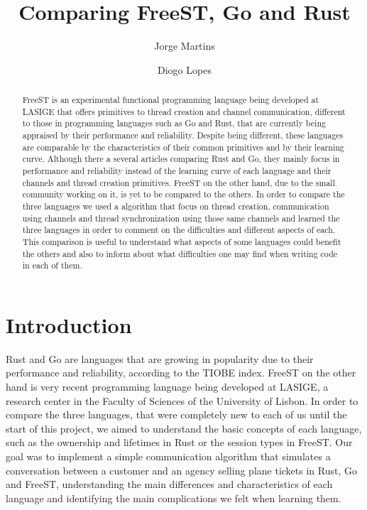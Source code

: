 \documentclass[runningheads]{llncs}
\begin{document}
\title{Comparing FreeST, Go and Rust}
\author{Jorge Martins \and
Diogo Lopes
}
\nocite{*}
\maketitle
\thispagestyle{empty}
\begin{abstract}
FreeST is an experimental functional programming language being developed at LASIGE that offers primitives to thread creation and channel communication, different to those in programming languages such as Go and Rust, that are currently being appraised by their performance and reliability. Despite being different, these languages are comparable by the characteristics of their common primitives and by their learning curve. Although there a several articles comparing Rust and Go, they mainly focus in performance and reliability instead of the learning curve of each language and their channels and thread creation primitives. FreeST on the other hand, due to the small community working on it, is yet to be compared to the others.
In order to compare the three languages we used a algorithm that focus on thread creation, communication using channels and thread synchronization using those same channels and learned the three languages in order to comment on the difficulties and different aspects of each.
This comparison is useful to understand what aspects of some languages could benefit the others and also to inform about what difficulties one may find when writing code in each of them.
\end{abstract}
\section{Introduction}
Rust and Go are languages that are growing in popularity due to their performance and reliability, according to the TIOBE index. FreeST\cite{freest} on the other hand is very recent programming language being developed at LASIGE, a research center in the Faculty of Sciences of the University of Lisbon.
In order to compare the three languages, that were completely new to each of us until the start of this project, we aimed to understand the basic concepts of each language, such as the ownership and lifetimes in Rust or the session types \cite{session} in FreeST.
Our goal was to implement a simple communication algorithm that simulates a conversation between a customer and an agency selling plane tickets in Rust, Go and FreeST, understanding the main differences and characteristics of each language and identifying the main complications we felt when learning them.
\newpage
\end{document}

